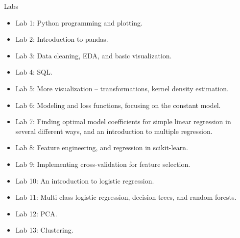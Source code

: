 \documentclass[aspectratio=169]{../latex_main/tntbeamer}  %
\begin{document}
	
	\begin{frame}{Labs}
	    \begin{itemize}
	        \item Lab 1: Python programming and plotting.
	        \item Lab 2: Introduction to pandas.
	        \item Lab 3: Data cleaning, EDA, and basic visualization.
	        \item Lab 4: SQL.
	        \item Lab 5: More visualization – transformations, kernel density estimation.
	        \item Lab 6: Modeling and loss functions, focusing on the constant model.
	        \item Lab 7: Finding optimal model coefficients for simple linear regression in several different ways, and an introduction to multiple regression.
	        \item Lab 8: Feature engineering, and regression in scikit-learn.
	        \item Lab 9: Implementing cross-validation for feature selection.
	        \item Lab 10: An introduction to logistic regression.
	        \item Lab 11: Multi-class logistic regression, decision trees, and random forests.
	        \item Lab 12: PCA.
	        \item Lab 13: Clustering.
	    \end{itemize}
	\end{frame}
	
\end{document}

